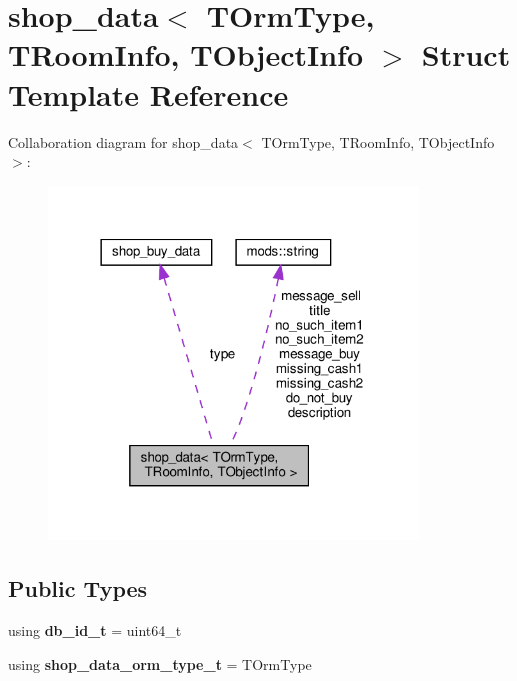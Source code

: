 \hypertarget{structshop__data}{}\section{shop\+\_\+data$<$ T\+Orm\+Type, T\+Room\+Info, T\+Object\+Info $>$ Struct Template Reference}
\label{structshop__data}


Collaboration diagram for shop\+\_\+data$<$ T\+Orm\+Type, T\+Room\+Info, T\+Object\+Info $>$\+:\nopagebreak
\begin{figure}[H]
\begin{center}
\leavevmode
\includegraphics[width=278pt]{structshop__data__coll__graph}
\end{center}
\end{figure}
\subsection*{Public Types}
\begin{DoxyCompactItemize}
\item 
\mbox{\label{structshop__data_aa8d5ca6548fe7a560e226933db1f7af8}} 
using {\bfseries db\+\_\+id\+\_\+t} = uint64\+\_\+t
\item 
\mbox{\label{structshop__data_a93a07e41ba0d56b6fa9ffa4c39625754}} 
using {\bfseries shop\+\_\+data\+\_\+orm\+\_\+type\+\_\+t} = T\+Orm\+Type
\end{DoxyCompactItemize}
